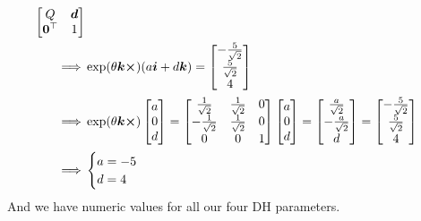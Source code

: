 \documentclass[a4paper]{scrartcl}
\begin{document}
\begin{equation}
\begin{aligned}
\begin{bmatrix}
            Q & \bm{d} \\ \bm{0}^\top & 1
        \end{bmatrix}\\
        \implies & \exp(\theta \bm{k}\cross)(a \bm{i} + d \bm{k}) = \begin{bmatrix}
            -\frac{5}{\sqrt{2}} \\ \frac{5}{\sqrt{2}} \\ 4
        \end{bmatrix}\\
        \implies &  \exp(\theta \bm{k}\cross) \begin{bmatrix}
            a \\ 0 \\ d
        \end{bmatrix} = 
        \begin{bmatrix}
            \frac{1}{\sqrt{2}} & \frac{1}{\sqrt{2}} & 0 \\
            -\frac{1}{\sqrt{2}} & \frac{1}{\sqrt{2}} & 0 \\
            0 & 0 & 1
        \end{bmatrix}
        \begin{bmatrix}
            a \\ 0 \\ d
        \end{bmatrix} = 
        \begin{bmatrix}
            \frac{a}{\sqrt{2}} \\ -\frac{a}{\sqrt{2}} \\ d
        \end{bmatrix} = 
        \begin{bmatrix}
            -\frac{5}{\sqrt{2}} \\ \frac{5}{\sqrt{2}} \\ 4
        \end{bmatrix}\\
        \implies & \begin{cases}
            a = -5\\
            d = 4
        \end{cases} 
    \end{aligned}
\end{equation}
And we have numeric values for all our four DH parameters.
\end{document}
